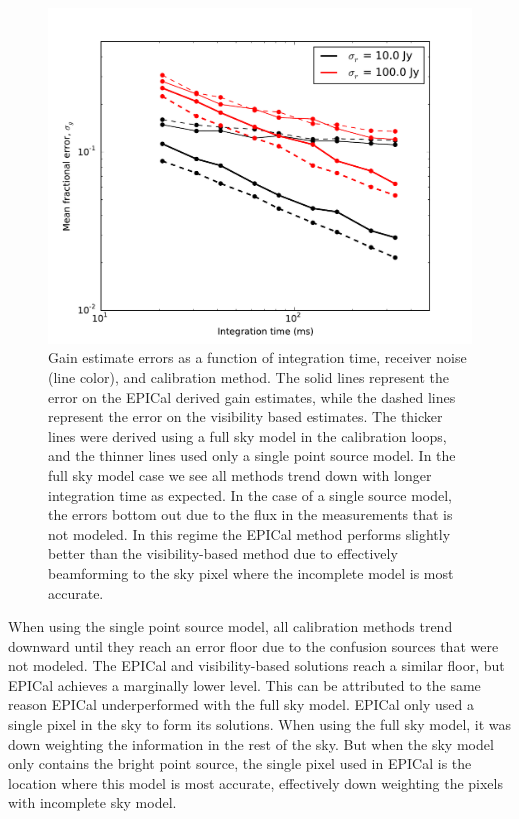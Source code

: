 \documentclass[a4paper,fleqn,usenatbib]{../mnras}
\begin{document}
\begin{figure}
\begin{center}
\includegraphics[width=\columnwidth]{figures/cal_paper_errors_complex_sky.pdf}
\caption{Gain estimate errors as a function of integration time, receiver noise (line color), and calibration method. The solid lines represent the error on the EPICal derived gain estimates, while the dashed lines represent the error on the visibility based estimates. The thicker lines were derived using a full sky model in the calibration loops, and the thinner lines used only a single point source model. In the full sky model case we see all methods trend down with longer integration time as expected. In the case of a single source model, the errors bottom out due to the flux in the measurements that is not modeled. In this regime the EPICal method performs slightly better than the visibility-based method due to effectively beamforming to the sky pixel where the incomplete model is most accurate.  
}
\label{fig:errors}
\end{center}
\end{figure}

When using the single point source model, all calibration methods trend downward until they reach an error floor due to the confusion sources that were not modeled. The EPICal and visibility-based solutions reach a similar floor, but EPICal achieves a marginally lower level. This can be attributed to the same reason EPICal underperformed with the full sky model. EPICal only used a single pixel in the sky to form its solutions. When using the full sky model, it was down weighting the information in the rest of the sky. But when the sky model only contains the bright point source, the single pixel used in EPICal is the location where this model is most accurate, effectively down weighting the pixels with incomplete sky model.
\end{document}
